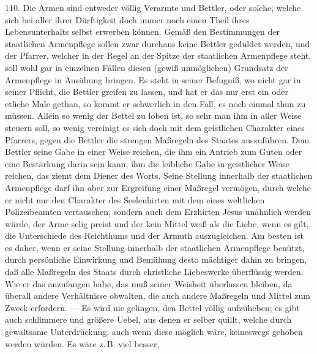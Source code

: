 110. Die Armen sind entweder völlig Verarmte und Bettler, oder solche, welche sich bei aller ihrer Dürftigkeit doch immer noch einen Theil ihres Lebensunterhalts selbst erwerben können. Gemäß den Bestimmungen der staatlichen Armenpflege sollen zwar durchaus keine Bettler geduldet werden, und der Pfarrer, welcher in der Regel an der Spitze der staatlichen Armenpflege steht, soll wohl gar in einzelnen Fällen diesen (gewiß unmöglichen) Grundsatz der Armenpflege in Ausübung bringen. Es steht in seiner Befugniß, wo nicht gar in seiner Pflicht, die Bettler greifen zu lassen, und hat er das nur erst ein oder etliche
Male gethan, so kommt er schwerlich in den Fall, es noch einmal thun zu müssen. Allein so wenig der Bettel zu loben ist, so sehr man ihm in aller Weise steuern soll, so wenig vereinigt es sich doch mit dem geistlichen Charakter eines Pfarrers, gegen die Bettler die strengen Maßregeln des Staates auszuführen. Dem Bettler seine Gabe in einer Weise reichen, die ihm ein Antrieb zum Guten oder eine Bestärkung darin sein kann, ihm die leibliche Gabe in geistlicher Weise reichen, das ziemt dem Diener des Worts. Seine Stellung innerhalb der staatlichen Armenpflege darf ihn aber zur Ergreifung einer Maßregel vermögen, durch welche er nicht nur den Charakter des Seelenhirten mit dem eines weltlichen Polizeibeamten vertauschen, sondern auch dem Erzhirten Jesus unähnlich werden würde, der Arme selig preist und der kein Mittel weiß als die Liebe, wenn es gilt, die Unterschiede des Reichthums und der Armuth auszugleichen. Am besten ist es daher, wenn er seine Stellung innerhalb der staatlichen Armenpflege benützt, durch persönliche Einwirkung und Bemühung desto mächtiger dahin zu bringen, daß alle Maßregeln des Staats durch christliche Liebeswerke überflüssig werden. Wie er das anzufangen habe, das muß seiner Weisheit überlassen bleiben, da überall andere Verhältnisse obwalten, die auch andere Maßregeln und Mittel zum Zweck erfordern. — Es wird nie gelingen, den Bettel völlig aufzuheben; es gibt auch schlimmere und größere Uebel, aus denen er selber quillt, welche durch gewaltsame Unterdrückung, auch wenn diese möglich wäre, keineswegs gehoben werden würden. Es wäre z.\,B. viel besser,
